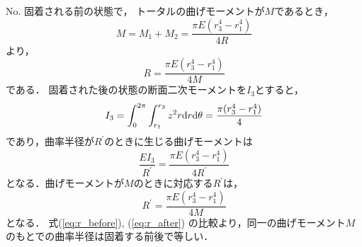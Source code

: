 \documentclass[a4paper]{jsarticle}
\begin{document}
\subsubsection{}
No.
固着される前の状態で，
トータルの曲げモーメントが$M$であるとき，
\begin{equation}
  M = M_1 + M_2 = \frac{\pi E (r_3^4 - r_1^4)}{4 R}
\end{equation}
より，
\begin{equation}
  \label{eq:r_before}
  R = \frac{\pi E (r_3^4 - r_1^4)}{4 M}
\end{equation}
である．
固着された後の状態の断面二次モーメントを$I_3$とすると，
\begin{equation}
  I_3 = \int_0^{2\pi} \int_{r_1}^{r_3} z^2 r \mathrm{d} r \mathrm{d} \theta
  = \frac{\pi (r_3^4 - r_1^4)}{4}                                             \\
\end{equation}
であり，曲率半径が$R^{\prime}$のときに生じる曲げモーメントは
\begin{equation}
  \frac{EI_3}{R^{\prime}} = \frac{\pi E (r_3^4 - r_1^4)}{4 R^{\prime}}
\end{equation}
となる．曲げモーメントが$M$のときに対応する$R^{\prime}$は，
\begin{equation}
  \label{eq:r_after}
  R^{\prime} = \frac{\pi E (r_3^4 - r_1^4)}{4 M}
\end{equation}
となる．
式(\ref{eq:r_before}), (\ref{eq:r_after})
の比較より，同一の曲げモーメント$M$のもとでの曲率半径は固着する前後で等しい．
\end{document}
